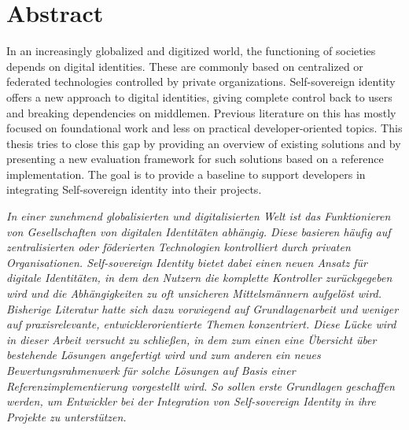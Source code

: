 \chapter*{Abstract}

In an increasingly globalized and digitized world, the functioning of societies depends on digital identities. These are commonly based on centralized or federated technologies controlled by private organizations. Self-sovereign identity offers a new approach to digital identities, giving complete control back to users and breaking dependencies on middlemen. Previous literature on this has mostly focused on foundational work and less on practical developer-oriented topics. This thesis tries to close this gap by providing an overview of existing solutions and by presenting a new evaluation framework for such solutions based on a reference implementation. The goal is to provide a baseline to support developers in integrating Self-sovereign identity into their projects.

\textit{In einer zunehmend globalisierten und digitalisierten Welt ist das Funktionieren von Gesellschaften von digitalen Identitäten abhängig. Diese basieren häufig auf zentralisierten oder föderierten Technologien kontrolliert durch privaten Organisationen. Self-sovereign Identity bietet dabei einen neuen Ansatz für digitale Identitäten, in dem den Nutzern die komplette Kontroller zurückgegeben wird und die Abhängigkeiten zu oft unsicheren Mittelsmännern aufgelöst wird. Bisherige Literatur hatte sich dazu vorwiegend auf Grundlagenarbeit und weniger auf praxisrelevante, entwicklerorientierte Themen konzentriert. Diese Lücke wird in dieser Arbeit versucht zu schließen, in dem zum einen eine Übersicht über bestehende Lösungen angefertigt wird und zum anderen ein neues Bewertungsrahmenwerk für solche Lösungen auf Basis einer Referenzimplementierung vorgestellt wird. So sollen erste Grundlagen geschaffen werden, um Entwickler bei der Integration von Self-sovereign Identity in ihre Projekte zu unterstützen.}

